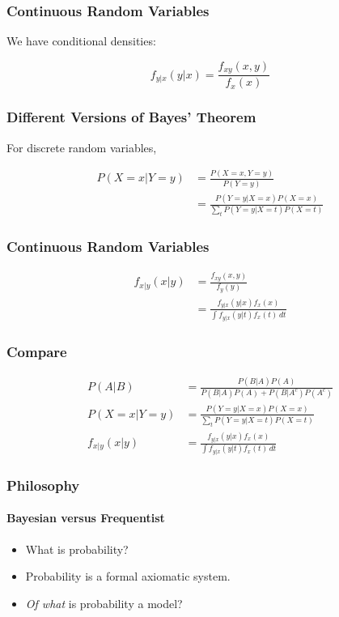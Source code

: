 \documentclass[12pt]{beamer}
\begin{document}
\begin{frame}
	\frametitle{Continuous Random Variables}
	
	We have conditional densities:
	
	\[
	f_{y|x}(y|x) = \frac{f_{xy}(x,y)}{f_x(x)}
	\]
	
\end{frame}
\begin{frame}
	\frametitle{Different Versions of Bayes' Theorem}
	
	For discrete random variables,
	
	\[
	\begin{aligned}
		P(X = x|Y = y) &= \frac{P(X = x, Y = y)}{P(Y = y)} \\[1em]
		&= \frac{P(Y = y|X = x)P(X = x)}{\sum_t P(Y = y|X = t)P(X = t)}
	\end{aligned}
	\]
	
\end{frame}
\begin{frame}
	\frametitle{Continuous Random Variables}
	
	\[
	\begin{aligned}
		f_{x|y}(x|y) &= \frac{f_{xy}(x,y)}{f_y(y)} \\[1em]
		&= \frac{f_{y|x}(y|x)f_x(x)}{\int f_{y|x}(y|t)f_x(t)\,dt}
	\end{aligned}
	\]
	
\end{frame}
\begin{frame}
	\frametitle{Compare}
	
	\[
	\begin{aligned}
		P(A|B) &= \frac{P(B|A)P(A)}{P(B|A)P(A) + P(B|A^c)P(A^c)} \\[2em]
		P(X = x|Y = y) &= \frac{P(Y = y|X = x)P(X = x)}{\sum_t P(Y = y|X = t)P(X = t)} \\[2em]
		f_{x|y}(x|y) &= \frac{f_{y|x}(y|x)f_x(x)}{\int f_{y|x}(y|t)f_x(t)\,dt}
	\end{aligned}
	\]
	
\end{frame}
\begin{frame}
	\frametitle{Philosophy}
	\framesubtitle{Bayesian versus Frequentist}
	
	\begin{itemize}[label={\color{blue}$\blacktriangleright$}]
		\item What is probability?
		
		\item Probability is a formal axiomatic system.
		
		\item \textit{Of what} is probability a model?
	\end{itemize}
	
\end{frame}
\end{document}
